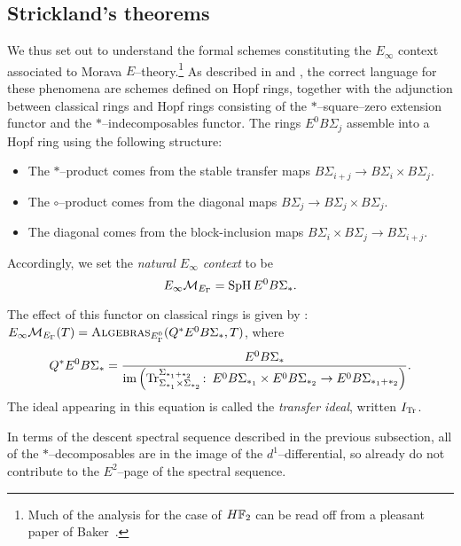 \subsection*{Strickland's theorems}

We thus set out to understand the formal schemes constituting the \(E_\infty\) context associated to Morava \(E\)--theory.\footnote{Much of the analysis for the case of \(\HFtwo\) can be read off from a pleasant paper of Baker~\cite{Baker}.}  As described in  and , the correct language for these phenomena are schemes defined on Hopf rings, together with the adjunction between classical rings and Hopf rings consisting of the \(\ast\)--square--zero extension functor and the \(\ast\)--indecomposables functor.  The rings \(E^0 B\Sigma_j\) assemble into a Hopf ring using the following structure:
\begin{itemize}
    \item The \(\ast\)--product comes from the stable transfer maps \(B\Sigma_{i+j} \to B\Sigma_i \times B\Sigma_j\).
    \item The \(\circ\)--product comes from the diagonal maps \(B\Sigma_j \to B\Sigma_j \times B\Sigma_j\).
    \item The diagonal comes from the block-inclusion maps \(B\Sigma_i \times B\Sigma_j \to B\Sigma_{i+j}\).
\end{itemize}

\begin{definition}
Accordingly, we set the \textit{natural \(E_\infty\) context} to be \[E_\infty\mathcal{M}_{E_\Gamma} = \operatorname{SpH} E^0 B\Sigma_*.\]
\end{definition}

The effect of this functor on classical rings is given by : \(E_\infty\mathcal{M}_{E_\Gamma}(T) = \normalfont\textsc{Algebras}_{E_\Gamma^0}(Q^* E^0 B\Sigma_*, T)\), where \[Q^* E^0 B\Sigma_* = \frac{E^0 B\Sigma_*}{\operatorname{im}\left(\mathrm{Tr}_{\Sigma_{*_1} \times \Sigma_{*_2}}^{\Sigma_{*_1 + *_2}}\colon\thinspace E^0 B\Sigma_{*_1} \times E^0 B\Sigma_{*_2} \to E^0 B\Sigma_{*_1 + *_2}\right)}.\]  The ideal appearing in this equation is called the \textit{transfer ideal}, written \(I_{\mathrm{Tr}}\).

\begin{remark}
In terms of the descent spectral sequence described in the previous subsection, all of the \(*\)--decomposables are in the image of the \(d^1\)--differential, so already do not contribute to the \(E^2\)--page of the spectral sequence.
\end{remark}

